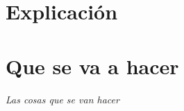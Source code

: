 \section{Explicación}
{\begin{small}%
\begin{flushright}%
\it

\end{flushright}%
\end{small}%
\vspace{.5cm}}

\section{Que se va a hacer}
{\begin{small}%
\begin{flushright}%
\it
Las cosas que se van hacer
\end{flushright}%
\end{small}%
\vspace{.5cm}}